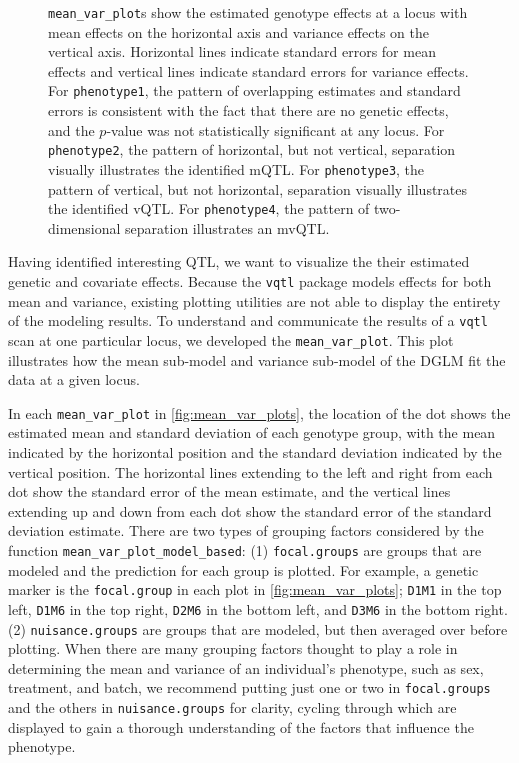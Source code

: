 \begin{figure}
    \caption[
        \texttt{mean\_var\_plot}s show the estimated genotype effects at a locus with mean effects on the horizontal axis and variance effects on the vertical axis.
    ]
    {
        \texttt{mean\_var\_plot}s show the estimated genotype effects at a locus with mean effects on the horizontal axis and variance effects on the vertical axis.
        Horizontal lines indicate standard errors for mean effects and vertical lines indicate standard errors for variance effects.
        For \texttt{phenotype1}, the pattern of overlapping estimates and standard errors is consistent with the fact that there are no genetic effects, and the $p$-value was not statistically significant at any locus.
        For \texttt{phenotype2}, the pattern of horizontal, but not vertical, separation visually illustrates the identified mQTL.
        For \texttt{phenotype3}, the pattern of vertical, but not horizontal, separation visually illustrates the identified vQTL.
        For \texttt{phenotype4}, the pattern of two-dimensional separation illustrates an mvQTL.
        \label{fig:mean_var_plots}
    }
\end{figure}

Having identified interesting QTL, we want to visualize the their estimated genetic and covariate effects.
Because the \texttt{vqtl} package models effects for both mean and variance, existing plotting utilities are not able to display the entirety of the modeling results.
To understand and communicate the results of a \texttt{vqtl} scan at one particular locus, we developed the \texttt{mean\_var\_plot}.
This plot illustrates how the mean sub-model and variance sub-model of the DGLM fit the data at a given locus.

In each \texttt{mean\_var\_plot} in \autoref{fig:mean_var_plots}, the location of the dot shows the estimated mean and standard deviation of each genotype group, with the mean indicated by the horizontal position and the standard deviation indicated by the vertical position.
The horizontal lines extending to the left and right from each dot show the standard error of the mean estimate, and the vertical lines extending up and down from each dot show the standard error of the standard deviation estimate.
There are two types of grouping factors considered by the function \texttt{mean\_var\_plot\_model\_based}:
(1) \texttt{focal.groups} are groups that are modeled and the prediction for each group is plotted.
For example, a genetic marker is the \texttt{focal.group} in each plot in \autoref{fig:mean_var_plots}; \texttt{D1M1} in the top left, \texttt{D1M6} in the top right, \texttt{D2M6} in the bottom left, and \texttt{D3M6} in the bottom right.
(2) \texttt{nuisance.groups} are groups that are modeled, but then averaged over before plotting.
When there are many grouping factors thought to play a role in determining the mean and variance of an individual's phenotype, such as sex, treatment, and batch, we recommend putting just one or two in \texttt{focal.groups} and the others in \texttt{nuisance.groups} for clarity, cycling through which are displayed to gain a thorough understanding of the factors that influence the phenotype.


